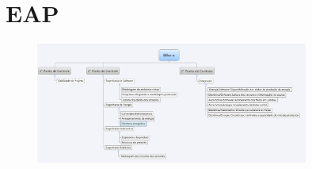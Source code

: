 \chapter*[EAP]{EAP}

\begin{figure}[h]
  \centering
  \includegraphics[width=0.8\textwidth]
      {figuras/bike-x2.eps}
  \caption[eap]
  \label{EAP}
\end{figure}
